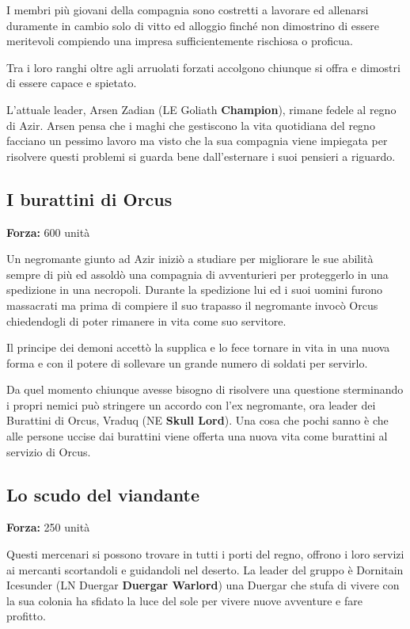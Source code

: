 \documentclass[letterpaper,twocolumn,openany,nodeprecatedcode]{dndbook}
\begin{document}
I membri più giovani della compagnia sono costretti a lavorare ed allenarsi duramente in cambio solo di vitto ed alloggio finché non dimostrino di essere meritevoli compiendo una impresa sufficientemente rischiosa o proficua. 

Tra i loro ranghi oltre agli arruolati forzati accolgono chiunque si offra e dimostri di essere capace e spietato.

L'attuale leader, Arsen Zadian (LE Goliath \textbf{Champion}), rimane fedele al regno di Azir. Arsen pensa che i maghi che gestiscono la vita quotidiana del regno facciano un pessimo lavoro ma visto che la sua compagnia viene impiegata per risolvere questi problemi si guarda bene dall'esternare i suoi pensieri a riguardo.

\subsection{I burattini di Orcus}
\textbf{Forza:} 600 unità

Un negromante giunto ad Azir iniziò a studiare per migliorare le sue abilità sempre di più ed assoldò una compagnia di avventurieri per proteggerlo in una spedizione in una necropoli. Durante la spedizione lui ed i suoi uomini furono massacrati ma prima di compiere il suo trapasso il negromante invocò Orcus chiedendogli di poter rimanere in vita come suo servitore. 

Il principe dei demoni accettò la supplica e lo fece tornare in vita in una nuova forma e con il potere di sollevare un grande numero di soldati per servirlo.

Da quel momento chiunque avesse bisogno di risolvere una questione sterminando i propri nemici può stringere un accordo con l'ex negromante, ora leader dei Burattini di Orcus, Vraduq (NE \textbf{Skull Lord}). Una cosa che pochi sanno è che alle persone uccise dai burattini viene offerta una nuova vita come burattini al servizio di Orcus.

\subsection{Lo scudo del viandante}
\textbf{Forza:} 250 unità

Questi mercenari si possono trovare in tutti i porti del regno, offrono i loro servizi ai mercanti scortandoli e guidandoli nel deserto.
La leader del gruppo è Dornitain Icesunder (LN Duergar \textbf{Duergar Warlord}) una Duergar che stufa di vivere con la sua colonia ha sfidato la luce del sole per vivere nuove avventure e fare profitto. 
\end{document}
